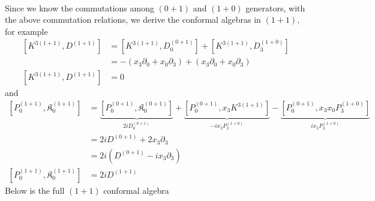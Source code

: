 \documentclass[]{article}
\numberwithin{equation}{section}
\begin{document}
{{\begin{align}
\end{align}
Since we know the commutations among $(0+1)$ and $(1+0)$ generators, with the above commutation relations, we derive the conformal algebras in $(1+1)$, for example
\begin{align}
    \left[K^{3(1+1)}, D^{(1+1)}\right]&=\left[K^{3(1+1)}, D^{(0+1)}_{0}\right]+\left[K^{3(1+1)}, D^{(1+0)}_{3}\right]\\
    &=-(x_{3}\partial_{0}+x_{0}\partial_{3})+(x_{3}\partial_{0}+x_{0}\partial_{3})\\
    \left[K^{3(1+1)}, D^{(1+1)}\right]&=0
\end{align}
and
\begin{align}
    \left[P_{0}^{(1+1)}, \mathfrak{K}_{0}^{(1+1)}\right]&=\underbrace{\left[P_{0}^{(0+1)}, \mathfrak{K}_{0}^{(0+1)}\right]}_{2iD^{(0+1)}_{0}}+\underbrace{\left[P_{0}^{(0+1)}, x_{3}K^{3(1+1)}\right]}_{-ix_{3}P_{3}^{(1+0)}}-\underbrace{\left[P_{0}^{(0+1)}, x_{3}x_{0}P_{3}^{(1+0)}\right]}_{ix_{3}P_{3}^{(1+0)}}\\
    &=2iD^{(0+1)}+2x_{3}\partial_{3}\\
    &=2i(D^{(0+1)}-ix_{3}\partial_{3})\\
    \left[P_{0}^{(1+1)}, \mathfrak{K}_{0}^{(1+1)}\right]&=2iD^{(1+1)}
\end{align}
Below is the full $(1+1)$ conformal algebra
\begin{table}[h!]
\centering
\caption{\label{tabelinterpolationifd}$1+1$ conformal algebra in IFD}
\end{table}

}}
\end{document}
